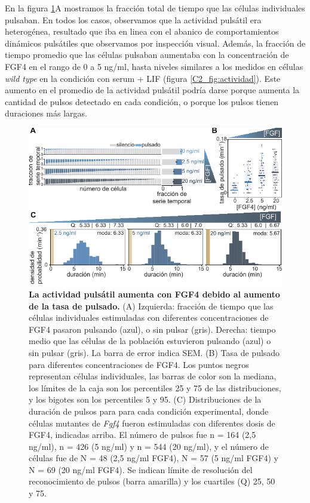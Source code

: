 \documentclass[./main.tex]{subfiles}
\begin{document}
En la figura \ref{C3_fig:FGF_actividad}A mostramos la fracción total de tiempo que las células individuales pulsaban. En todos los casos, observamos que la actividad pulsátil era heterogénea, resultado que iba en linea con el abanico de comportamientos dinámicos pulsátiles que observamos por inspección visual. Además, la fracción de tiempo promedio que las células pulsaban aumentaba con la concentración de FGF4 en el rango de 0 a 5 ng/ml, hasta niveles similares a los medidos en células \textit{wild type} en la condición con serum + LIF (figura \ref{C2_fig:actividad}). Este aumento en el promedio de la actividad pulsátil podría darse porque aumenta la cantidad de pulsos detectado en cada condición, o porque los pulsos tienen duraciones más largas. 


\begin{figure}
    \centering
    \includegraphics[width=1\columnwidth]{figures/chapter3/C3_FGF_activity.pdf} \caption{\textbf{La actividad pulsátil aumenta con FGF4 debido al aumento de la tasa de pulsado.} (A) Izquierda: fracción de tiempo que las células individuales estimuladas con diferentes concentraciones de FGF4 pasaron pulsando (azul), o sin pulsar (gris). Derecha: tiempo medio que las células de la población estuvieron pulsando (azul) o sin pulsar (gris). La barra de error indica SEM. (B) Tasa de pulsado para diferentes concentraciones de FGF4. Los puntos negros representan células individuales, las barras de color son la mediana, los límites de la caja son los percentiles 25 y 75 de las distribuciones, y los bigotes son los percentiles 5 y 95. (C) Distribuciones de la duración de pulsos para para cada condición experimental, donde células mutantes de \textit{Fgf4} fueron estimuladas con diferentes dosis de FGF4, indicadas arriba. El número de pulsos fue n = 164 (2,5 ng/ml), n = 426 (5 ng/ml) y n = 544 (20 ng/ml), y el número de células fue de N = 48 (2,5 ng/ml FGF4), N = 57 (5 ng/ml FGF4) y N = 69 (20 ng/ml FGF4). Se indican límite de resolución del reconocimiento de pulsos (barra amarilla) y los cuartiles (Q) 25, 50 y 75.}
    \label{C3_fig:FGF_actividad}
\end{figure}
\end{document}
